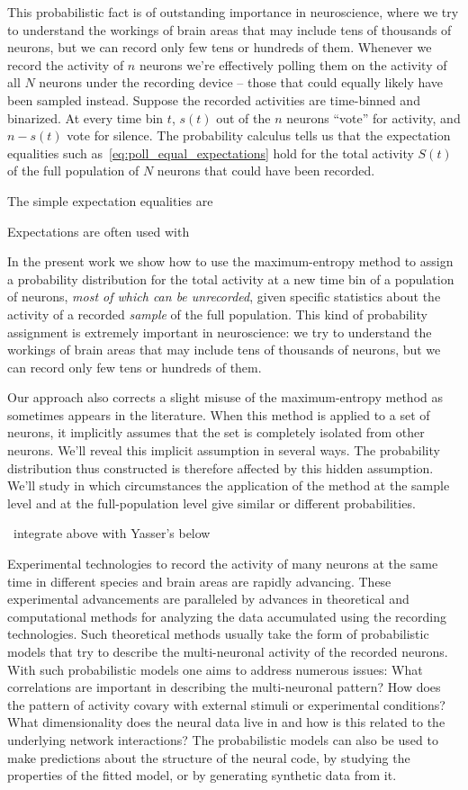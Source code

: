 \documentclass[\ifafour a4paper,12pt,\else a5paper,10pt,\fi%
onecolumn,oneside,article,%
british%
]{memoir}
\theoremstyle{remark}
\theoremstyle{innote}
\renewcommand*{\|}{\nonscript\,\vert\nonscript\;\mathopen{}}
\newcommand*{\puzzle}{{\fontencoding{U}\fontfamily{fontawesometwo}\selectfont\symbol{225}}}
\newcommand{\mynote}[1]{ {\color{notecolour}\puzzle\ #1}}
\begin{document}
This probabilistic fact is of outstanding importance in neuroscience, where
we try to understand the workings of brain areas that may include tens of
thousands of neurons, but we can record only few tens or hundreds of them.
Whenever we record the activity of $n$ neurons we're effectively polling
them on the activity of all $N$ neurons under the recording device -- those
that could equally likely have been sampled instead. Suppose the recorded
activities are time-binned and binarized. At every time bin $t$, $s(t)$ out
of the $n$ neurons \enquote{vote} for activity, and $n-s(t)$ vote for
silence. The probability calculus tells us that the expectation equalities
such as~\eqref{eq:poll_equal_expectations} hold for the total activity
$S(t)$ of the full population of $N$ neurons that could have been recorded.

The simple expectation equalities are 

Expectations are often used with


\bigskip




In the present work we show how to use the maximum-entropy method to assign
a probability distribution for the total activity at a new time bin of a
population of neurons, \emph{most of which can be unrecorded}, given
specific statistics about the activity of a recorded \emph{sample} of the
full population. This kind of probability assignment is extremely important
in neuroscience: we try to understand the workings of brain areas that may
include tens of thousands of neurons, but we can record only few tens or
hundreds of them.

Our approach also corrects a slight misuse of the maximum-entropy method
as sometimes appears in the literature. When this method is applied to a
set of neurons, it implicitly assumes that the set is completely isolated
from other neurons. We'll reveal this implicit assumption in several ways.
The probability distribution thus constructed is therefore affected by this
hidden assumption. We'll study in which circumstances the application of
the method at the sample level and at the full-population level give
similar or different probabilities.


\mynote{integrate above with Yasser's below}

Experimental technologies to record the activity of many neurons at the
same time in different species and brain areas are rapidly advancing. These
experimental advancements are paralleled by advances in theoretical and
computational methods for analyzing the data accumulated using the
recording technologies. Such theoretical methods usually take the form of
probabilistic models that try to describe the multi-neuronal activity of
the recorded neurons. With such probabilistic models one aims to address
numerous issues: What correlations are important in describing the
multi-neuronal pattern? How does the pattern of activity covary with
external stimuli or experimental conditions? What dimensionality does the
neural data live in and how is this related to the underlying network
interactions? The probabilistic models can also be used to make predictions
about the structure of the neural code, by studying the properties of the
fitted model, or by generating synthetic data from it.
\end{document}
